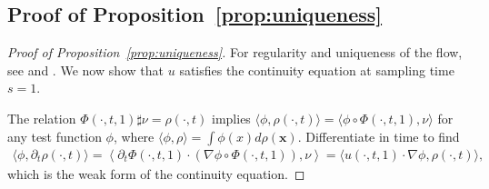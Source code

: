 \documentclass{article}
\newcommand{\bfx}{\boldsymbol{x}}
\theoremstyle{definition}
\theoremstyle{plain}
\theoremstyle{definition}
\theoremstyle{remark}
\newcommand{\Flow}{\Phi}
\begin{document}
\subsection{Proof of Proposition~\ref{prop:uniqueness}}
\begin{proof}[Proof of Proposition~\ref{prop:uniqueness}]

For regularity and uniqueness of the flow, see \citep[Lemma 4.1.9]{abraham_manifolds_1988} and \citep[Theorem 4.1.11]{abraham_manifolds_1988}. We now show that $u$ satisfies the continuity equation at sampling time $s = 1$.





The relation $\Flow(\cdot, t, 1) \sharp \nu = \rho(\cdot, t) $ implies $\langle \phi, \rho(\cdot, t)  \rangle = \langle \phi \circ \Flow(\cdot, t, 1), \nu \rangle$ for any test function $\phi$, where $\langle \phi, \rho \rangle = \int \phi(x) d\rho(\bfx)$. Differentiate in time to find
    \begin{align}
        \langle \phi, \partial_t \rho(\cdot, t)  \rangle = \left \langle \partial_t \Flow(\cdot, t, 1)  \cdot \left( \nabla \phi \circ \Flow(\cdot, t, 1)  \right), \nu \right \rangle = \langle u(\cdot, t, 1)  \cdot \nabla \phi, \rho(\cdot, t)  \rangle,
    \end{align}
    which is the weak form of the continuity equation.
\end{proof}
\end{document}
